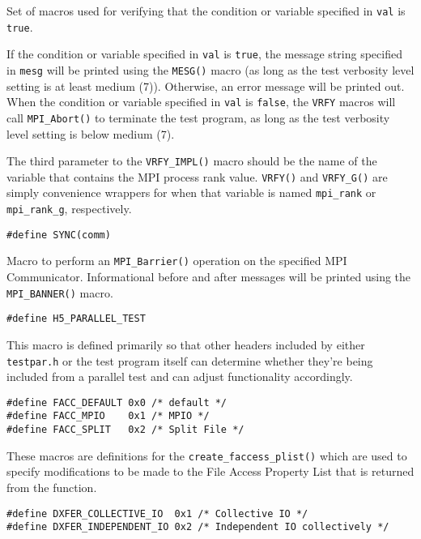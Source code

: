 \documentclass[../HDF5_RFC.tex]{subfiles}
\begin{document}
Set of macros used for verifying that the condition or variable specified in \texttt{val} is \texttt{true}.

If the condition or variable specified in \texttt{val} is \texttt{true}, the message string specified in
\texttt{mesg} will be printed using the \texttt{MESG()} macro (as long as the test verbosity level setting
is at least medium (7)). Otherwise, an error message will be printed out. When the condition or variable specified in \texttt{val} is \texttt{false}, the \texttt{VRFY} macros will call \texttt{MPI\_Abort()} to
terminate the test program, as long as the test verbosity level setting is below medium (7).

The third parameter to the \texttt{VRFY\_IMPL()} macro should be the name of the variable that contains
the MPI process rank value. \texttt{VRFY()} and \texttt{VRFY\_G()} are simply convenience wrappers for
when that variable is named \texttt{mpi\_rank} or \texttt{mpi\_rank\_g}, respectively.

\begin{verbatim}
#define SYNC(comm)
\end{verbatim}

Macro to perform an \texttt{MPI\_Barrier()} operation on the specified MPI Communicator. Informational
before and after messages will be printed using the \texttt{MPI\_BANNER()} macro.

\begin{verbatim}
#define H5_PARALLEL_TEST
\end{verbatim}

This macro is defined primarily so that other headers included by either \texttt{testpar.h}
or the test program itself can determine whether they're being included from a parallel test
and can adjust functionality accordingly.

\begin{verbatim}
#define FACC_DEFAULT 0x0 /* default */
#define FACC_MPIO    0x1 /* MPIO */
#define FACC_SPLIT   0x2 /* Split File */
\end{verbatim}

These macros are definitions for the \texttt{create\_faccess\_plist()} which are used to specify
modifications to be made to the File Access Property List that is returned from the function.

\begin{verbatim}
#define DXFER_COLLECTIVE_IO  0x1 /* Collective IO */
#define DXFER_INDEPENDENT_IO 0x2 /* Independent IO collectively */
\end{verbatim}
\end{document}

